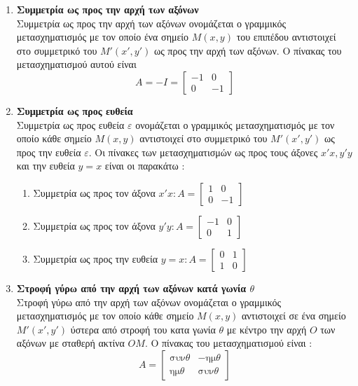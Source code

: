 \documentclass[twoside,10pt]{book}
\newcommand{\hm}[1]{\textrm{ημ}#1}
\newcommand{\syn}[1]{\textrm{συν}#1}
\begin{document}
\begin{enumerate}[itemsep=0mm,label=\bf\arabic*.]
\item \textbf{Συμμετρία ως προς την αρχή των αξόνων}\\
Συμμετρία ως προς την αρχή των αξόνων ονομάζεται ο γραμμικός μετασχηματισμός με τον οποίο ένα σημείο $ M(x,y) $ του επιπέδου αντιστοιχεί στο συμμετρικό του $ M'(x',y') $ ως προς την αρχή των αξόνων. Ο πίνακας του μετασχηματισμού αυτού είναι \[ Α=-Ι=\begin{bmatrix}
-1 & 0\\0 & -1
\end{bmatrix} \]
\item \textbf{Συμμετρία ως προς ευθεία}\\
Συμμετρία ως προς ευθεία $ \varepsilon $ ονομάζεται ο γραμμικός μετασχηματισμός με τον οποίο κάθε σημείο $ M(x,y) $ αντιστοιχεί στο συμμετρικό του $ M'(x',y') $ ως προς την ευθεία $ \varepsilon $. Οι πίνακες των μετασχηματισμών ως προς τους άξονες $ x'x,y'y $ και την ευθεία $ y=x $ είναι οι παρακάτω :
\begin{enumerate}[itemsep=0mm,label=\roman*.]
\item Συμμετρία ως προς τον άξονα $ x'x : Α=\begin{bmatrix}
1 & 0\\0 & -1
\end{bmatrix}$
\item Συμμετρία ως προς τον άξονα $ y'y : Α=\begin{bmatrix}
-1 & 0\\0 & 1
\end{bmatrix}$
\item Συμμετρία ως προς την ευθεία $ y=x : Α=\begin{bmatrix}
0 & 1\\1 & 0
\end{bmatrix}$
\end{enumerate}
\item \textbf{Στροφή γύρω από την αρχή των αξόνων κατά γωνία {\boldmath$ \theta $}}\\
Στροφή γύρω από την αρχή των αξόνων ονομάζεται ο γραμμικός μετασχηματισμός με τον οποίο κάθε σημείο $ M(x,y) $ αντιστοιχεί σε ένα σημείο $ M'(x',y') $ ύστερα από στροφή του κατα γωνία $ \theta $ με κέντρο την αρχή $ O $ των αξόνων με σταθερή ακτίνα $ OM $. Ο πίνακας του μετασχηματισμού είναι : \[ A=\begin{bmatrix}
\syn{\theta} & -\hm{\theta}\\\hm{\theta} & \syn{\theta}
\end{bmatrix} \]

\end{enumerate}
\end{document}
